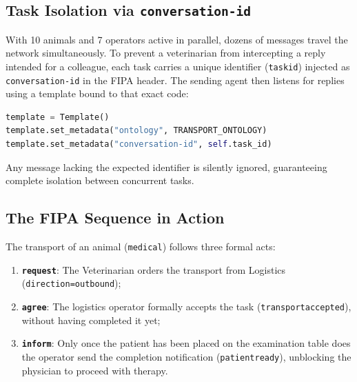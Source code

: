 \documentclass{article}
\renewcommand{\_}{\oldtextunderscore\allowbreak}
\begin{document}
\subsection{Task Isolation via \texttt{conversation-id}}
With 10 animals and 7 operators active in parallel, dozens of messages travel the network simultaneously. To prevent a veterinarian from intercepting a reply intended for a colleague, each task carries a unique identifier (\texttt{task\_id}) injected as \texttt{conversation-id} in the FIPA header. The sending agent then listens for replies using a template bound to that exact code:
\begin{lstlisting}[language=Python]
template = Template()
template.set_metadata("ontology", TRANSPORT_ONTOLOGY)
template.set_metadata("conversation-id", self.task_id)
\end{lstlisting}
Any message lacking the expected identifier is silently ignored, guaranteeing complete isolation between concurrent tasks.
\subsection{The FIPA Sequence in Action}
The transport of an animal (\texttt{medical\_001}) follows three formal acts:
\begin{enumerate}
    \item \textbf{\texttt{request}}: The Veterinarian orders the transport from Logistics (\texttt{direction=outbound});
    \item \textbf{\texttt{agree}}: The logistics operator formally accepts the task (\texttt{transport\_accepted}), without having completed it yet;
    \item \textbf{\texttt{inform}}: Only once the patient has been placed on the examination table does the operator send the completion notification (\texttt{patient\_ready}), unblocking the physician to proceed with therapy.
\end{enumerate}
\end{document}
